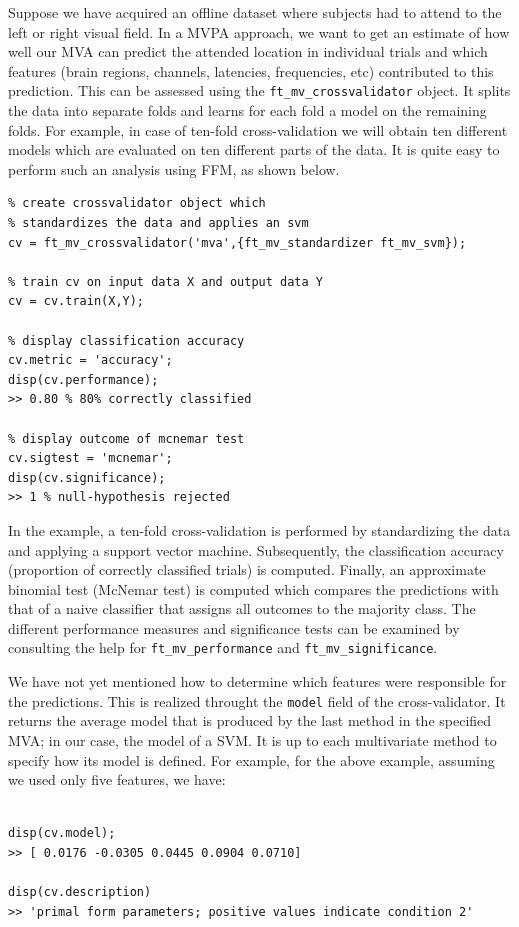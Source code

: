 \documentclass{article}
\renewcommand{\t}[1]{{\tt #1}}
\begin{document}
Suppose we have acquired an offline dataset where subjects had to attend to the left or right visual field. In a MVPA approach, we want to get an estimate of how well our MVA can predict the attended location in individual trials and which features (brain regions, channels, latencies, frequencies, etc) contributed to this prediction. This can be assessed using the \t{ft\_mv\_crossvalidator} object. It splits the data into separate folds and learns for each fold a model on the remaining folds. For example, in case of ten-fold cross-validation we will obtain ten different models which are evaluated on ten different parts of the data. It is quite easy to perform such an analysis using FFM, as shown below.
\begin{verbatim}
% create crossvalidator object which 
% standardizes the data and applies an svm
cv = ft_mv_crossvalidator('mva',{ft_mv_standardizer ft_mv_svm});

% train cv on input data X and output data Y
cv = cv.train(X,Y);

% display classification accuracy
cv.metric = 'accuracy';
disp(cv.performance);
>> 0.80 % 80% correctly classified

% display outcome of mcnemar test
cv.sigtest = 'mcnemar';
disp(cv.significance);
>> 1 % null-hypothesis rejected
\end{verbatim}
In the example, a ten-fold cross-validation is performed by standardizing the data and applying a support vector machine. Subsequently, the classification accuracy (proportion of correctly classified trials) is computed. Finally, an approximate binomial test (McNemar test) is computed which compares the predictions with that of a naive classifier that assigns all outcomes to the majority class. The different performance measures and significance tests can be examined by consulting the help for \t{ft\_mv\_performance} and \t{ft\_mv\_significance}.

We have not yet mentioned how to determine which features were responsible for the predictions. This is realized throught the \t{model} field of the cross-validator. It returns the average model that is produced by the last method in the specified MVA; in our case, the model of a SVM. It is up to each multivariate method to  specify how its model is defined. For example, for the above example, assuming we used only five features, we have:
\begin{verbatim}

disp(cv.model);
>> [ 0.0176 -0.0305 0.0445 0.0904 0.0710]

disp(cv.description)
>> 'primal form parameters; positive values indicate condition 2'

\end{verbatim}
\end{document}
